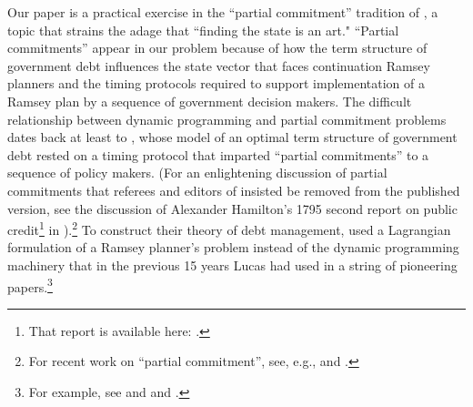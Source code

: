 \documentclass[12pt]{article}
\newcommand{\NW}[1]{{\textcolor{blue}{#1}}}
\begin{document}
 {Our paper is  a practical  exercise in  the ``partial commitment'' tradition of \citet[Sec.~6]{lucas1982optimal},  a topic that strains  the  adage
 that ``finding the state is an art." ``Partial commitments'' appear in our problem   because of how the term structure of government debt influences the state vector  that faces continuation Ramsey planners and  the timing protocols required  to support  implementation of a Ramsey plan by a sequence of government decision makers.  The difficult relationship between dynamic programming and partial commitment problems dates back at least to 
  \cite{LucasStokey1983}, whose model of an optimal term structure of government debt rested on a timing protocol that imparted ``partial commitments'' to a sequence of policy makers. (For an enlightening  discussion of partial commitments that  referees and editors of \cite{LucasStokey1983} insisted be removed from the published version, see  the discussion of Alexander Hamilton's 1795  second report on public credit\footnote{That report is available here: \citet{hamilton_1795}.} in   \citet[Sec.~6]{lucas1982optimal}).\footnote{{For recent work on  ``partial commitment'', see, e.g., \citet{clymo2020fiscal} and \cite{chari2020optimal}.}
}  
 To construct their theory of debt management, \citeauthor{LucasStokey1983} used a Lagrangian formulation of a Ramsey planner's problem instead of 
 the dynamic programming machinery that in the previous 15 years Lucas had used in a string of pioneering papers.\footnote{For example, see \citet{LucasPrescott1971}
 and \citet{Lucas1978} and \citet{stokey1989recursive}.}  




}
\end{document}

